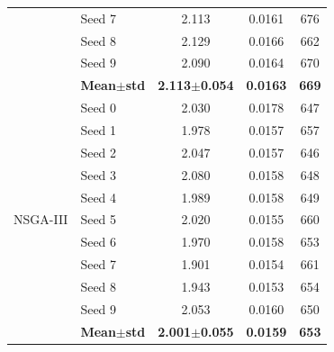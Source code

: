 \begin{table}[H]
\begin{tabular}{@{}llccc@{}}
  & Seed 7 & {\small 2.113} & {\small 0.0161} & {\small 676} \\
  & Seed 8 & {\small 2.129} & {\small 0.0166} & {\small 662} \\
  & Seed 9 & {\small 2.090} & {\small 0.0164} & {\small 670} \\
  & \textbf{Mean$\pm$std} & \textbf{2.113$\pm$0.054} & \cellcolor{ForestGreen!25}\textbf{0.0163} & \textbf{669} \\
\midrule
\multirow{11}{*}{NSGA-III}
  & Seed 0 & {\small 2.030} & {\small 0.0178} & {\small 647} \\
  & Seed 1 & {\small 1.978} & {\small 0.0157} & {\small 657} \\
  & Seed 2 & {\small 2.047} & {\small 0.0157} & {\small 646} \\
  & Seed 3 & {\small 2.080} & {\small 0.0158} & {\small 648} \\
  & Seed 4 & {\small 1.989} & {\small 0.0158} & {\small 649} \\
  & Seed 5 & {\small 2.020} & {\small 0.0155} & {\small 660} \\
  & Seed 6 & {\small 1.970} & {\small 0.0158} & {\small 653} \\
  & Seed 7 & {\small 1.901} & {\small 0.0154} & {\small 661} \\
  & Seed 8 & {\small 1.943} & {\small 0.0153} & {\small 654} \\
  & Seed 9 & {\small 2.053} & {\small 0.0160} & {\small 650} \\
  & \textbf{Mean$\pm$std} & \textbf{2.001$\pm$0.055} & \cellcolor{ForestGreen!25}\textbf{0.0159} & \textbf{653} \\
\bottomrule
\end{tabular}
\end{table}

